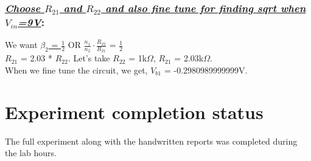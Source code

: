 \documentclass[12pt]{article}
\begin{document}
\subsubsection*{\textit{\underline{Choose $R_{21}$ and $R_{22}$ and also fine tune for finding sqrt when $V_{in}$=9V}}:}
We want \hyperlink{equation(9)}{$\beta_2$ = $\frac{1}{2}$} OR $\frac{n_1}{n_2}\cdot\frac{R_{22}}{R_{21}}$ = $\frac{1}{2}$\\ $R_{21}$ = 2.03 * $R_{22}$. Let's take $R_{22}$ = 1k$\Omega$, $R_{21}$ = 2.03k$\Omega$. \\
When we fine tune the circuit, we get, $V_{b1}$ = -0.2980989999999V.
\section{Experiment completion status}
The full experiment along with the handwritten reports was completed during the lab hours.
\end{document}
